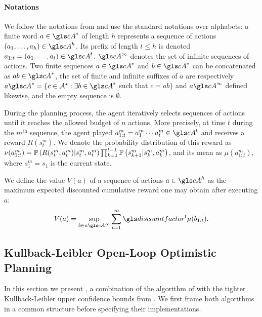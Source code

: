\paragraph{Notations}
We follow the notations from \citep{Bubeck2010} and use the standard notations over alphabets: a finite word $a \in \cA^{\ast}$ of length $h$ represents a sequence of actions $(a_1, \dots, a_h) \in \cA^h$. Its prefix of length $t \leq h$ is denoted $a_{1:t} = (a_1,\dots,a_t) \in \cA^t$. $\cA^\infty$ denotes the set of infinite sequences of actions. Two finite sequences $a\in \cA^{\ast}$ and $b\in \cA^{\ast}$ can be concatenated as $ab\in \cA^{\ast}$, the set of finite and infinite suffixes of $a$ are respectively $a \cA^{\ast} = \{c\in\mathcal{A}^{\star}: \exists b\in \cA^{\ast}$ such that $c=ab\}$ and $a\cA^\infty$ defined likewise, and the empty sequence is $\emptyset$.

During the planning process, the agent iteratively selects sequences of actions until it reaches the allowed budget of $n$ actions. More precisely, at time $t$ during the $m^{\text{th}}$ sequence, the agent played $a^m_{1:t} = a^m_1 \cdots a^m_t \in \cA^t$ and receives a reward $R(s_t^m)$. We denote the probability distribution of this reward as $\nu(a_{1:t}^m) = \mathbb{P}\left(R(s_t^m, a_t^m) | s_t^m, a_t^m\right) \prod_{k=1}^{t-1} \mathbb{P}\left(s_{k+1}^m | s_{k}^m, a_{k}^m\right)$, and its mean as $\mu(a_{1:t}^m)$, where $s_1^m=s_1$ is the current state.


\begin{definition}
	\begin{leftbar}[defnbar]
	\label{def:sequence-values}
	We define the value $V(a)$ of a sequence of actions $a\in \cA^h$ as the maximum expected discounted cumulative reward one may obtain after executing $a$:
	\begin{equation}
	\label{eq:value}
	V(a) = \sup_{b\in a\cA^\infty} \sum_{t=1}^\infty \discount^t\mu(b_{1:t}).
	\end{equation}
	\end{leftbar}
\end{definition}


\subsection{Kullback-Leibler Open-Loop Optimistic Planning}
\label{sec:kl-olop}

In this section we present \KLOLOP, a combination of the \OLOP algorithm of \citep{Bubeck2010} with the tighter Kullback-Leibler upper confidence bounds from \citep{Cappe2013}. We first frame both algorithms in a common structure before specifying their implementations.

